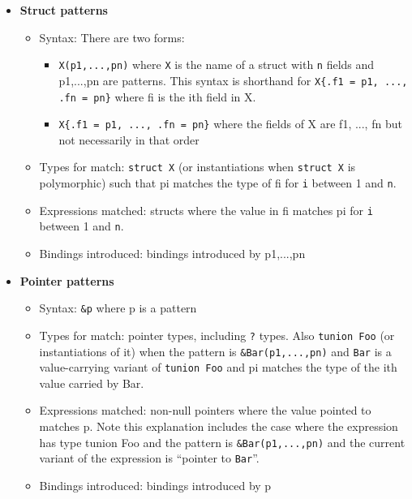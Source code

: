 \begin{itemize}
\item \textbf{Struct patterns}
  \begin{itemize}
  \item Syntax: There are two forms:
    \begin{itemize}
    \item \texttt{X(p1,...,pn)} where \texttt{X} is the name of a struct
      with \texttt{n} fields and p1,...,pn are patterns.  This syntax is
      shorthand for \verb|X{.f1 = p1, ..., .fn = pn}| where fi is the
      ith field in X\@.
    \item \verb|X{.f1 = p1, ..., .fn = pn}| where the fields of X
      are f1, ..., fn but not necessarily in that order
    \end{itemize}
      
  \item Types for match: \texttt{struct X} (or instantiations when
    \texttt{struct X} is polymorphic) such that pi matches the type of
    fi for \texttt{i} between 1 and \texttt{n}.
  \item Expressions matched: structs where the value in fi matches pi
    for \texttt{i} between 1 and \texttt{n}.
  \item Bindings introduced: bindings introduced by p1,...,pn
  \end{itemize}
  
\item \textbf{Pointer patterns}
  \begin{itemize}
  \item Syntax: \texttt{\&p} where p is a pattern
  \item Types for match: pointer types, including \texttt{?} types.
    Also \texttt{tunion Foo} (or instantiations of it) when the pattern
    is \texttt{\&Bar(p1,...,pn)} and \texttt{Bar} is a value-carrying
    variant of \texttt{tunion Foo} and pi matches the type of the ith
    value carried by Bar.
  \item Expressions matched: non-null pointers where the value pointed
    to matches p.  Note this explanation includes the case where the
    expression has type tunion Foo and the pattern is
    \texttt{\&Bar(p1,...,pn)} and the current variant of the expression is
    ``pointer to \texttt{Bar}''.
  \item Bindings introduced: bindings introduced by p
  \end{itemize}
  

\end{itemize}
